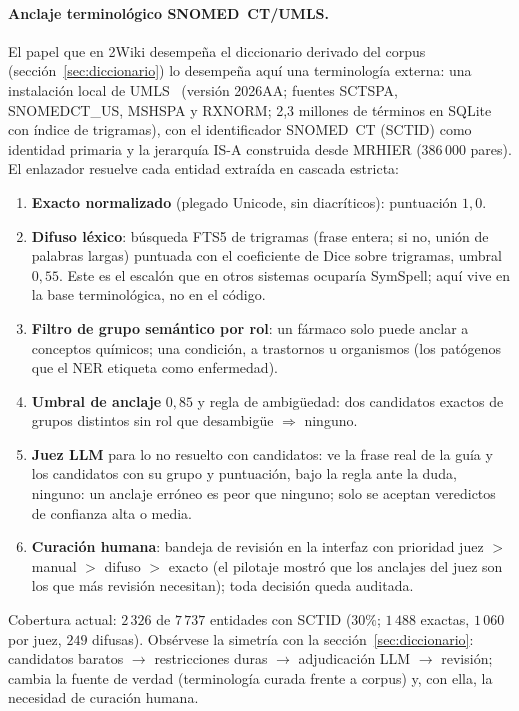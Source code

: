 \documentclass[11pt,a4paper]{article}
\begin{document}
\paragraph{Anclaje terminológico SNOMED~CT/UMLS.}
El papel que en 2Wiki desempeña el diccionario derivado del corpus
(sección~\ref{sec:diccionario}) lo desempeña aquí una terminología externa:
una instalación local de UMLS~\cite{umls} (versión 2026AA; fuentes SCTSPA,
SNOMEDCT\_US, MSHSPA y RXNORM; 2,3 millones de términos en SQLite con
índice de trigramas), con el identificador SNOMED~CT (SCTID) como identidad
primaria y la jerarquía IS-A construida desde MRHIER ($386\,000$ pares). El
enlazador resuelve cada entidad extraída en cascada estricta:
\begin{enumerate}[leftmargin=1.6em, itemsep=1pt]
\item \textbf{Exacto normalizado} (plegado Unicode, sin diacríticos):
  puntuación $1{,}0$.
\item \textbf{Difuso léxico}: búsqueda FTS5 de trigramas (frase entera;
  si no, unión de palabras largas) puntuada con el coeficiente de Dice
  sobre trigramas, umbral $0{,}55$. Este es el escalón que en otros
  sistemas ocuparía SymSpell; aquí vive en la base terminológica, no en el
  código.
\item \textbf{Filtro de grupo semántico por rol}: un fármaco solo puede
  anclar a conceptos químicos; una condición, a trastornos u organismos
  (los patógenos que el NER etiqueta como enfermedad).
\item \textbf{Umbral de anclaje} $0{,}85$ y regla de ambigüedad: dos
  candidatos exactos de grupos distintos sin rol que desambigüe
  $\Rightarrow$ ninguno.
\item \textbf{Juez LLM} para lo no resuelto con candidatos: ve la frase
  real de la guía y los candidatos con su grupo y puntuación, bajo la regla
  \guillemotleft{}ante la duda, ninguno: un anclaje erróneo es peor que ninguno\guillemotright{}; solo
  se aceptan veredictos de confianza alta o media.
\item \textbf{Curación humana}: bandeja de revisión en la interfaz con
  prioridad juez $>$ manual $>$ difuso $>$ exacto (el pilotaje mostró que
  los anclajes del juez son los que más revisión necesitan); toda decisión
  queda auditada.
\end{enumerate}
Cobertura actual: $2\,326$ de $7\,737$ entidades con SCTID ($30\%$;
$1\,488$ exactas, $1\,060$ por juez, $249$ difusas). Obsérvese la simetría
con la sección~\ref{sec:diccionario}: candidatos baratos $\to$
restricciones duras $\to$ adjudicación LLM $\to$ revisión; cambia la fuente
de verdad (terminología curada frente a corpus) y, con ella, la necesidad
de curación humana.
\end{document}
